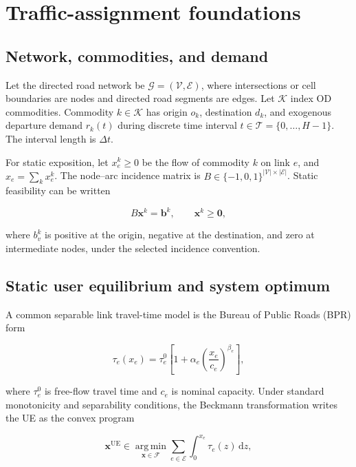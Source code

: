 \documentclass[11pt]{article}
\newcommand{\G}{\mathcal{G}}
\newcommand{\V}{\mathcal{V}}
\newcommand{\E}{\mathcal{E}}
\newcommand{\K}{\mathcal{K}}
\newcommand{\T}{\mathcal{T}}
\newcommand{\argmin}{\operatorname*{arg\,min}}
\newcommand{\vect}[1]{\bm{#1}}
\begin{document}
\section{Traffic-assignment foundations}

\subsection{Network, commodities, and demand}

Let the directed road network be
\(
  \G=(\V,\E)
\), where intersections or cell boundaries are nodes and directed road segments are
edges.  Let \(\K\) index OD commodities.  Commodity \(k\in\K\) has origin \(o_k\),
destination \(d_k\), and exogenous departure demand \(r_k(t)\) during discrete time
interval \(t\in\T=\{0,\ldots,H-1\}\).  The interval length is \(\Delta t\).

For static exposition, let \(x_e^k\geq 0\) be the flow of commodity \(k\) on link
\(e\), and \(x_e=\sum_k x_e^k\).  The node--arc incidence matrix is
\(B\in\{-1,0,1\}^{|\V|\times|\E|}\).  Static feasibility can be written

\begin{equation}
  B\vect{x}^k = \vect{b}^k,
  \qquad
  \vect{x}^k\geq \vect{0},
  \label{eq:static-conservation}
\end{equation}

where \(b_v^k\) is positive at the origin, negative at the destination, and zero at
intermediate nodes, under the selected incidence convention.

\subsection{Static user equilibrium and system optimum}

A common separable link travel-time model is the Bureau of Public Roads (BPR) form

\begin{equation}
  \tau_e(x_e)
  = \tau_e^0
  \left[
    1+\alpha_e\left(\frac{x_e}{c_e}\right)^{\beta_e}
  \right],
  \label{eq:bpr}
\end{equation}

where \(\tau_e^0\) is free-flow travel time and \(c_e\) is nominal capacity.  Under
standard monotonicity and separability conditions, the Beckmann transformation writes
the UE as the convex program \citep{beckmann1956}

\begin{equation}
  \vect{x}^{\mathrm{UE}}
  \in
  \argmin_{\vect{x}\in\mathcal{F}}
  \sum_{e\in\E}
  \int_0^{x_e}\tau_e(z)\,\mathrm{d}z,
  \label{eq:ue}
\end{equation}
\end{document}
